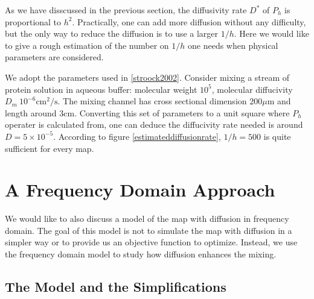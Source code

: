 \documentclass{article}
\begin{document}
As we have disscussed in the previous section, the diffusivity rate $D^*$ of $P_h$ is
proportional to $h^2$. Practically, one can add more diffusion without any difficulty,
but the only way to reduce the diffusion is to use a larger $1/h$. Here we would like to give a
rough estimation of the number on $1/h$ one needs when physical parameters are considered.

We adopt the parameters used in \ref{stroock2002}. Consider mixing a stream of protein
solution in aqueous buffer: molecular weight $10^5$, molecular diffucivity
$D_m~10^{-6} \text{cm}^2/\text{s}$. The mixing channel has cross sectional dimension
$200\mu \text{m}$ and length around $3\text{cm}$. Converting this set of parameters to a unit
square where $P_h$ operater is calculated from, one can deduce the diffucivity rate needed is
around $D =5 \times 10^{-5}$. According to figure \ref{estimateddiffusionrate}, $1/h=500$ is quite
sufficient for every map.







\section{A Frequency Domain Approach}
\label{A Frequency Domain Approach}

We would like to also discuss a model of the map with diffusion in
frequency domain. The goal of this model is not to simulate the map
with diffusion in a simpler way or to provide us an objective
function to optimize. Instead, we use the frequency domain model to
study how diffusion enhances the mixing.


\subsection{The Model and the Simplifications}
\end{document}
